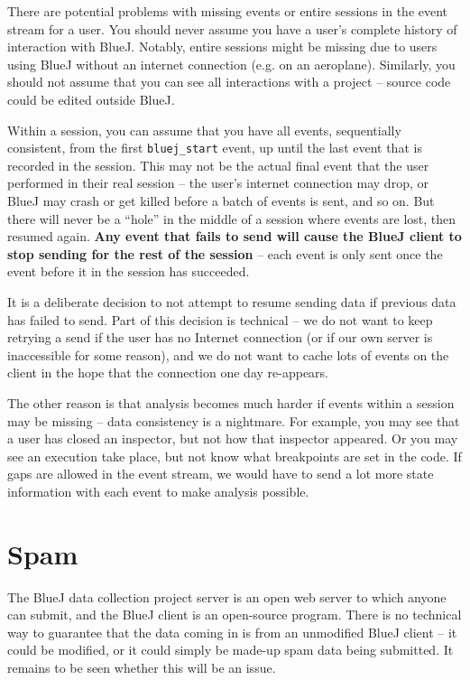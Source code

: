 \documentclass{report}
\begin{document}
There are potential problems with missing events or entire sessions in the
event stream for a user.  You should
never assume you have a user's complete history of interaction with BlueJ.
Notably, entire sessions might be missing due to users using BlueJ without an
internet connection (e.g. on an aeroplane).  Similarly, you should not assume
that you can see all interactions with a project -- source code could be
edited outside BlueJ.

Within a session, you can assume that you have all events, sequentially
consistent, from the first \texttt{bluej\_start} event, up until the last
event that is recorded in the session.  This may not be the actual final event
that the user performed in their real session -- the user's
internet connection may drop, or BlueJ may crash or get killed before a batch of events
is sent, and so on.  But there will never be a ``hole'' in the middle of a
session where events are lost, then resumed again.  \textbf{Any event that fails to
send will cause the BlueJ client to stop sending for the rest of the session}
-- each event is only sent once the event before it in the session has succeeded.

It is a deliberate decision to not attempt to resume sending data if previous
data has failed to send.  Part of this decision is technical -- we do not want
to keep retrying a send if the user has no Internet connection (or if our own
server is inaccessible for some reason), and we do not want to cache lots of
events on the client in the hope that the connection one day re-appears.

The other reason is that analysis becomes much harder if events within a session
may be missing -- data consistency is a nightmare.  For example, you may see
that a user has closed an inspector, but not how that inspector appeared.  Or
you may see an execution take place, but not know what breakpoints are set in
the code.  If gaps are allowed in the event stream, we would have to send a
lot more state information with each event to make analysis possible.

\section{Spam}
\label{def:spam}

The BlueJ data collection project server is an open web server to which anyone
can submit, and the BlueJ client is an open-source program.  There is no
technical way to guarantee that the data coming in is from an unmodified BlueJ
client -- it could be modified, or it could simply be made-up spam data being
submitted.  It remains to be seen whether this will be an issue.
\end{document}
